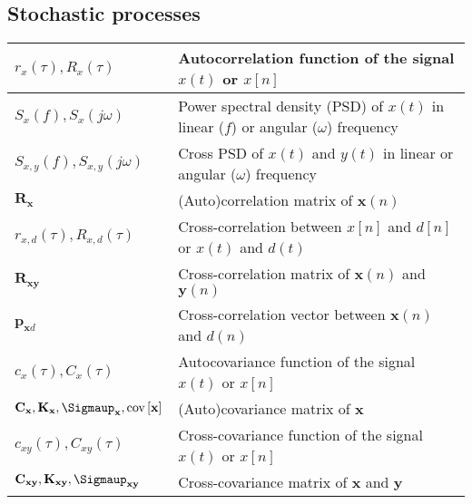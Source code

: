 \documentclass{article}
\begin{document}
\subsection{Stochastic processes}
\begin{xltabular}{\textwidth}{XX}
    \(r_x(\tau), R_x(\tau)\) & Autocorrelation function of the signal \(x(t)\) or \(x[n]\) \cite{nossekAdaptiveArraySignal2015}\\ \hline
    \(S_x(f), S_x(j\omega)\) & Power spectral density (PSD) of \(x(t)\) in linear (\(f\)) or angular (\(\omega\)) frequency\\ \hline
    \(S_{x,y}(f), S_{x,y}(j\omega)\) & Cross PSD of \(x(t)\) and \(y(t)\) in linear or angular (\(\omega\)) frequency\\ \hline
    \(\mathbf{R}_\mathbf{x}\) & (Auto)correlation matrix of \(\mathbf{x}(n)\) \\ \hline
    \(r_{x,d}(\tau), R_{x,d}(\tau)\) & Cross-correlation between \(x[n]\) and \(d[n]\) or \(x(t)\) and \(d(t)\) \cite{nossekAdaptiveArraySignal2015}\\ \hline
    \(\mathbf{R}_\mathbf{xy}\) & Cross-correlation matrix of \(\mathbf{x}(n)\) and \(\mathbf{y}(n)\)\\ \hline
    \(\mathbf{p}_{\mathbf{x}d}\)& Cross-correlation vector between \(\mathbf{x}(n)\) and \(d(n)\) \cite{dinizAdaptiveFiltering1997} \\ \hline
    \(c_x(\tau), C_x(\tau)\) & Autocovariance function of the signal \(x(t)\) or \(x[n]\) \cite{nossekAdaptiveArraySignal2015}\\ \hline
    \(\mathbf{C}_\mathbf{x}, \mathbf{K}_\mathbf{x}, \boldsymbol{\Sigmaup}_\mathbf{x}, \textnormal{cov}\left[ \mathbf{x} \right]\) & (Auto)covariance matrix of \(\mathbf{x}\) \cite{vantreesOptimumArrayProcessing2002,proakisDigitalCommunications2007,leon-garciaProbabilityStatisticsRandom2007,haykinAdaptiveFilterTheory2002} \\ \hline
    \(c_{xy}(\tau), C_{xy}(\tau)\) & Cross-covariance function of the signal \(x(t)\) or \(x[n]\) \cite{nossekAdaptiveArraySignal2015} \\ \hline
    \(\mathbf{C}_{\mathbf{xy}}, \mathbf{K}_{\mathbf{xy}}, \boldsymbol{\Sigmaup}_{\mathbf{xy}}\) & Cross-covariance matrix of \(\mathbf{x}\) and \(\mathbf{y}\)
\end{xltabular}
\end{document}
